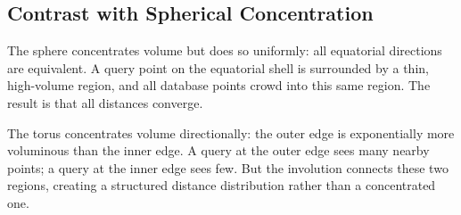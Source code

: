 \subsection{Contrast with Spherical Concentration}

The sphere concentrates volume but does so uniformly: all equatorial directions are equivalent. A query point on the equatorial shell is surrounded by a thin, high-volume region, and all database points crowd into this same region. The result is that all distances converge.

The torus concentrates volume directionally: the outer edge is exponentially more voluminous than the inner edge. A query at the outer edge sees many nearby points; a query at the inner edge sees few. But the involution connects these two regions, creating a structured distance distribution rather than a concentrated one.
